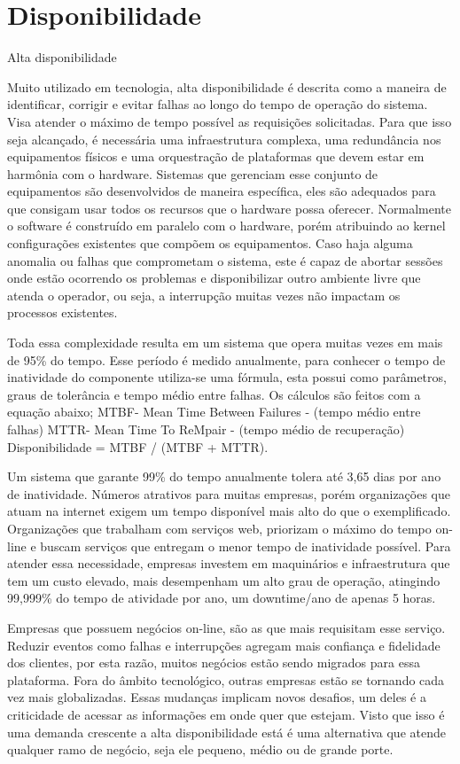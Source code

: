 \chapter{Disponibilidade}

Alta disponibilidade

Muito utilizado em tecnologia, alta disponibilidade é descrita como a maneira de identificar, corrigir e evitar falhas ao longo do tempo de operação do sistema. Visa atender o máximo de tempo possível as requisições solicitadas. Para que isso seja alcançado, é necessária uma infraestrutura complexa, uma redundância nos equipamentos físicos e uma orquestração de plataformas que devem estar em harmônia com o hardware. Sistemas que gerenciam esse conjunto de equipamentos são desenvolvidos de maneira específica, eles são adequados para que consigam usar todos os recursos que o hardware possa oferecer. Normalmente o software é construído em paralelo com o hardware, porém atribuindo ao kernel configurações existentes que compõem os equipamentos. 
Caso haja alguma anomalia ou falhas que comprometam o sistema, este é capaz de abortar sessões onde estão ocorrendo os problemas e disponibilizar outro ambiente livre que atenda o operador, ou seja, a interrupção muitas vezes não impactam os processos existentes.


Toda essa complexidade resulta em um sistema que opera muitas vezes em mais de 95\% do tempo. Esse período é medido anualmente, para conhecer o tempo de inatividade do componente utiliza-se uma fórmula, esta possui como parâmetros, graus de tolerância e tempo médio entre falhas. Os cálculos são feitos com a equação abaixo;
MTBF- Mean Time Between Failures - (tempo médio entre falhas)
MTTR- Mean Time To ReMpair - (tempo médio de recuperação)
Disponibilidade = MTBF / (MTBF + MTTR).


Um sistema que garante 99\% do tempo anualmente tolera até 3,65 dias por ano de inatividade. Números atrativos para muitas empresas, porém organizações que atuam na internet exigem um tempo disponível mais alto do que o exemplificado. Organizações que trabalham com serviços web, priorizam o máximo do tempo on-line e buscam serviços que entregam o menor tempo de inatividade possível. Para atender essa necessidade, empresas investem em maquinários e infraestrutura que tem um custo elevado, mais desempenham um alto grau de operação, atingindo 99,999\% do tempo de atividade por ano, um downtime/ano de apenas 5 horas.


Empresas que possuem negócios on-line, são as que mais requisitam esse serviço. Reduzir eventos como falhas e interrupções agregam mais confiança e fidelidade dos clientes, por esta razão, muitos negócios estão sendo migrados para essa plataforma. Fora do âmbito tecnológico, outras empresas estão se tornando cada vez mais globalizadas. Essas mudanças implicam novos desafios, um deles é a criticidade de acessar as informações em onde quer que estejam. Visto que isso é uma demanda crescente a alta disponibilidade está é uma alternativa que atende qualquer ramo de negócio, seja ele pequeno, médio ou de grande porte.


